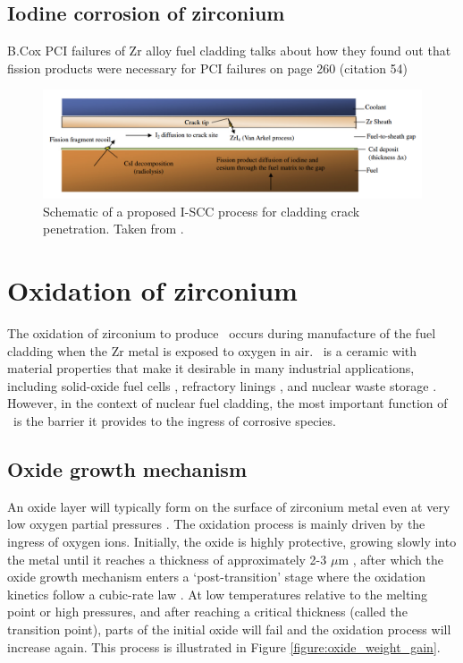 \subsection{Iodine corrosion of zirconium}

B.Cox PCI failures of Zr alloy fuel cladding \cite{bcoxpelletclad1990} talks about how they found out that fission products were necessary for PCI failures on page 260 (citation 54)


\begin{figure}[htp]
\centering
\includegraphics[width=16cm]{images/vanarkel.png}
\caption[Schematic of a proposed I-SCC process for cladding crack penetration.]{Schematic of a proposed I-SCC process for cladding crack penetration. Taken from \cite{Lewis2011}.}
\label{figure:vanarkel}
\end{figure}

\section{Oxidation of zirconium}

The oxidation of zirconium to produce \zirconia\ occurs during manufacture of the fuel cladding when the Zr metal is exposed to oxygen in air. \zirconia\ is a ceramic with material properties that make it desirable in many industrial applications, including solid-oxide fuel cells \cite{radford1979zirconia}, refractory linings \cite{whittemore1952fused}, and nuclear waste storage \cite{wang2012ceramics}. However, in the context of nuclear fuel cladding, the most important function of \zirconia\ is the barrier it provides to the ingress of corrosive species. 


\subsection{Oxide growth mechanism}

An oxide layer will typically form on the surface of zirconium metal even at very low oxygen partial pressures \cite{causey2005review}. The oxidation process is mainly driven by the ingress of oxygen ions. Initially, the oxide is highly protective, growing slowly into the metal until it reaches a thickness of approximately 2-3 $\mu$m \cite{garzarolli1991oxide,dawson1968kinetics}, after which the oxide growth mechanism enters a `post-transition' stage where the oxidation kinetics follow a cubic-rate law  \cite{porte1960oxidation}. At low temperatures relative to the melting point or high pressures, and after reaching a critical thickness (called the transition point), parts of the initial oxide will fail and the oxidation process will increase again. This process is illustrated in Figure \ref{figure:oxide_weight_gain}. 

